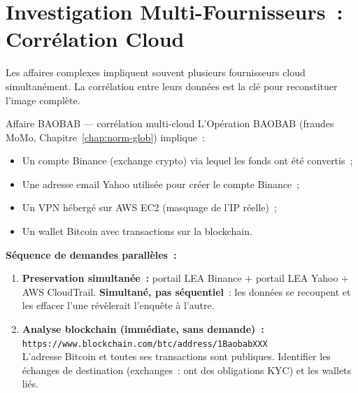 \section{Investigation Multi-Fournisseurs~: Corrélation Cloud}
\label{sec:correlation-cloud}

Les affaires complexes impliquent souvent plusieurs fournisseurs cloud
simultanément. La corrélation entre leurs données est la clé pour
reconstituer l'image complète.

\begin{boxscenario}{Affaire BAOBAB --- corrélation multi-cloud}
L'Opération BAOBAB (fraudes MoMo, Chapitre~\ref{chap:norm-glob}) implique~:
\begin{itemize}
    \item Un compte Binance (exchange crypto) via lequel les fonds
          ont été convertis~;
    \item Une adresse email Yahoo utilisée pour créer le compte Binance~;
    \item Un VPN hébergé sur AWS EC2 (masquage de l'IP réelle)~;
    \item Un wallet Bitcoin avec transactions sur la blockchain.
\end{itemize}

\textbf{Séquence de demandes parallèles~:}

\begin{enumerate}
    \item \textbf{Preservation simultanée~:} portail LEA Binance +
          portail LEA Yahoo + AWS CloudTrail. \textbf{Simultané,
          pas séquentiel}~: les données se recoupent et les effacer
          l'une révèlerait l'enquête à l'autre.

    \item \textbf{Analyse blockchain (immédiate, sans demande)~:}\\
          \texttt{https://www.blockchain.com/btc/address/1BaobabXXX}\\
          L'adresse Bitcoin et toutes ses transactions sont publiques.
          Identifier les échanges de destination (exchanges~: ont des
          obligations KYC) et les wallets liés.


\end{enumerate}
\end{boxscenario}
